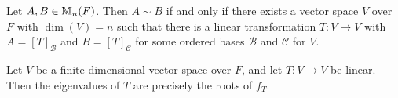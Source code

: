 \documentclass[class=article, crop=false]{standalone}
\begin{document}
  \begin{theorem}{13.2}
    Let $A, B\in \mathbb{M}_n(F)$. Then $A\sim B$ if and only if there exists a vector space $V$ over $F$ with $\dim(V) = n$ such that there is a linear transformation $T\colon V\to V$ with $A = [T]_{\mathcal{B}}$ and $B = [T]_{\mathcal{C}}$ for some ordered bases $\mathcal{B}$ and $\mathcal{C}$ for $V$.
  \end{theorem}
  \begin{theorem}{14.3}
    Let $V$ be a finite dimensional vector space over $F$, and let $T\colon V\to V$ be linear. Then the eigenvalues of $T$ are precisely the roots of $f_T$.
  \end{theorem}
\end{document}
